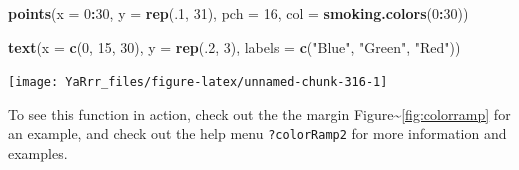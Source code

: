 \documentclass[]{book}
\newenvironment{Shaded}{\begin{snugshade}}{\end{snugshade}}
\newcommand{\KeywordTok}[1]{\textcolor[rgb]{0.13,0.29,0.53}{\textbf{#1}}}
\newcommand{\DataTypeTok}[1]{\textcolor[rgb]{0.13,0.29,0.53}{#1}}
\newcommand{\DecValTok}[1]{\textcolor[rgb]{0.00,0.00,0.81}{#1}}
\newcommand{\StringTok}[1]{\textcolor[rgb]{0.31,0.60,0.02}{#1}}
\newcommand{\OperatorTok}[1]{\textcolor[rgb]{0.81,0.36,0.00}{\textbf{#1}}}
\newcommand{\NormalTok}[1]{#1}
\theoremstyle{definition}
\theoremstyle{definition}
\theoremstyle{remark}
\begin{document}
\begin{Shaded}
\begin{Highlighting}[]
\KeywordTok{points}\NormalTok{(}\DataTypeTok{x =} \DecValTok{0}\OperatorTok{:}\DecValTok{30}\NormalTok{,}
       \DataTypeTok{y =} \KeywordTok{rep}\NormalTok{(.}\DecValTok{1}\NormalTok{, }\DecValTok{31}\NormalTok{), }\DataTypeTok{pch =} \DecValTok{16}\NormalTok{,}
       \DataTypeTok{col =} \KeywordTok{smoking.colors}\NormalTok{(}\DecValTok{0}\OperatorTok{:}\DecValTok{30}\NormalTok{))}

\KeywordTok{text}\NormalTok{(}\DataTypeTok{x =} \KeywordTok{c}\NormalTok{(}\DecValTok{0}\NormalTok{, }\DecValTok{15}\NormalTok{, }\DecValTok{30}\NormalTok{), }\DataTypeTok{y =} \KeywordTok{rep}\NormalTok{(.}\DecValTok{2}\NormalTok{, }\DecValTok{3}\NormalTok{),}
     \DataTypeTok{labels =} \KeywordTok{c}\NormalTok{(}\StringTok{"Blue"}\NormalTok{, }\StringTok{"Green"}\NormalTok{, }\StringTok{"Red"}\NormalTok{))}
\end{Highlighting}
\end{Shaded}

\begin{center}\texttt{[image: YaRrr\_files/figure-latex/unnamed-chunk-316-1]} \end{center}

To see this function in action, check out the the margin
Figure\textasciitilde{}\ref{fig:colorramp} for an example, and check out
the help menu \texttt{?colorRamp2} for more information and examples.
\end{document}
